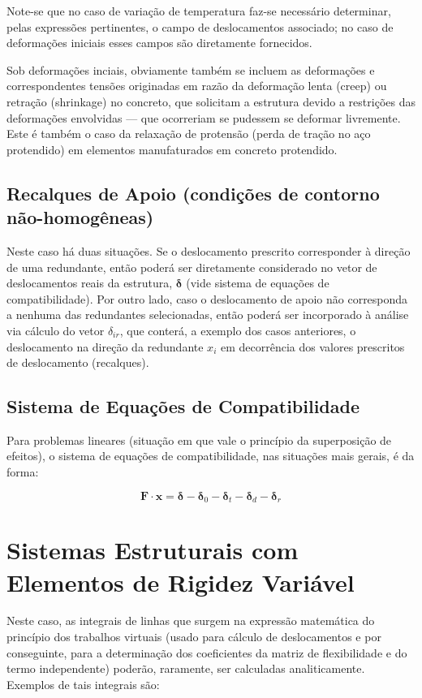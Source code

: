 Note-se que no caso de variação de temperatura faz-se necessário determinar, pelas expressões pertinentes, o campo de deslocamentos associado; no caso de deformações iniciais esses campos são diretamente fornecidos.

Sob deformações inciais, obviamente também se incluem as deformações e correspondentes tensões originadas em razão da deformação lenta (creep) ou retração (shrinkage) no concreto, que solicitam a estrutura devido a restrições das deformações envolvidas --- que ocorreriam se pudessem se deformar livremente. Este é também o caso da relaxação de protensão (perda de tração no aço protendido) em elementos manufaturados em concreto protendido.

\subsection{Recalques de Apoio (condições de contorno não-homogêneas)}

Neste caso há duas situações. Se o deslocamento prescrito corresponder à direção de uma redundante, então poderá ser diretamente considerado no vetor de deslocamentos reais da estrutura, \(\mathbf{\delta}\) (vide sistema de equações de compatibilidade). Por outro lado, caso o deslocamento de apoio não corresponda a nenhuma das redundantes selecionadas, então poderá ser incorporado à análise via cálculo do vetor \(\delta_{ir}\), que conterá, a exemplo dos casos anteriores, o deslocamento na direção da redundante \(x_i\) em decorrência dos valores prescritos de deslocamento (recalques).

\subsection{Sistema de Equações de Compatibilidade}

Para problemas lineares (situação em que vale o princípio da superposição de efeitos), o sistema de equações de compatibilidade, nas situações mais gerais, é da forma:

\[
	\mathbf{F} \cdot \mathbf{x}
	=
	\boldsymbol{\delta}
	-\boldsymbol{\delta}_0
	-\boldsymbol{\delta}_t
	-\boldsymbol{\delta}_d
	-\boldsymbol{\delta}_r
\]

\section{Sistemas Estruturais com Elementos de Rigidez Variável}

Neste caso, as integrais de linhas que surgem na expressão matemática do princípio dos trabalhos virtuais (usado para cálculo de deslocamentos e por conseguinte, para a determinação dos coeficientes da matriz de flexibilidade e do termo independente) poderão, raramente, ser calculadas analiticamente. Exemplos de tais integrais são:

